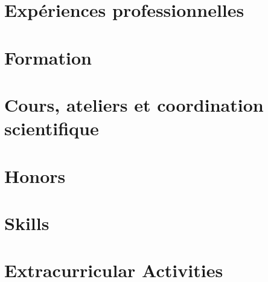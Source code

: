 \documentclass{prometheus_cv}
\begin{document}
\thispagestyle{empty}					%
\pagestyle{fancy}			 		%

\vspace*{-1cm}
\centering 

\cite{kervegan_marque_2023}\textsc{}

\vspace*{0.4cm}
\section{Expériences professionnelles}


\vspace*{0.4cm}
\section{Formation}


\section{Cours, ateliers et coordination scientifique}


\printbibliography[title={Publications}, keyword={publications}]
\printbibliography[title={Communications}, keyword={communications}]

\section{Honors}
%

\section{Skills}
%




\section{Extracurricular Activities}
%
\end{document}
